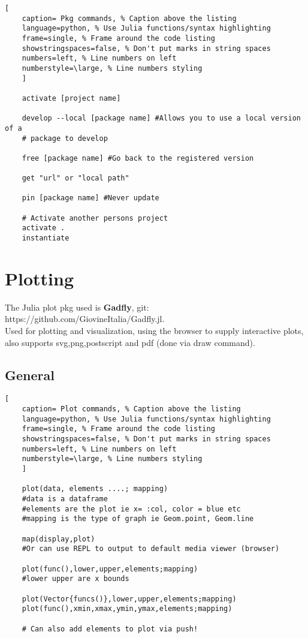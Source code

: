 \documentclass[11pt]{scrartcl} %
\begin{document}
\begin{lstlisting}[
	caption= Pkg commands, % Caption above the listing
	language=python, % Use Julia functions/syntax highlighting
	frame=single, % Frame around the code listing
	showstringspaces=false, % Don't put marks in string spaces
	numbers=left, % Line numbers on left
	numberstyle=\large, % Line numbers styling
	]

	activate [project name]

	develop --local [package name] #Allows you to use a local version of a 
	# package to develop

	free [package name] #Go back to the registered version

	get "url" or "local path"

	pin [package name] #Never update

	# Activate another persons project
	activate .
	instantiate

\end{lstlisting}

\newpage
\section{Plotting}

The Julia plot pkg used is \textbf{Gadfly}, git: https://github.com/GiovineItalia/Gadfly.jl.\\

Used for plotting and visualization, using the browser to supply interactive plots, also supports
svg,png,postscript and pdf (done via draw command).

\subsection{General}

\begin{lstlisting}[
	caption= Plot commands, % Caption above the listing
	language=python, % Use Julia functions/syntax highlighting
	frame=single, % Frame around the code listing
	showstringspaces=false, % Don't put marks in string spaces
	numbers=left, % Line numbers on left
	numberstyle=\large, % Line numbers styling
	]

	plot(data, elements ....; mapping)
	#data is a dataframe
	#elements are the plot ie x= :col, color = blue etc
	#mapping is the type of graph ie Geom.point, Geom.line

	map(display,plot) 
	#Or can use REPL to output to default media viewer (browser)

	plot(func(),lower,upper,elements;mapping)
	#lower upper are x bounds

	plot(Vector{funcs()},lower,upper,elements;mapping)
	plot(func(),xmin,xmax,ymin,ymax,elements;mapping)

	# Can also add elements to plot via push!

\end{lstlisting}
\end{document}
